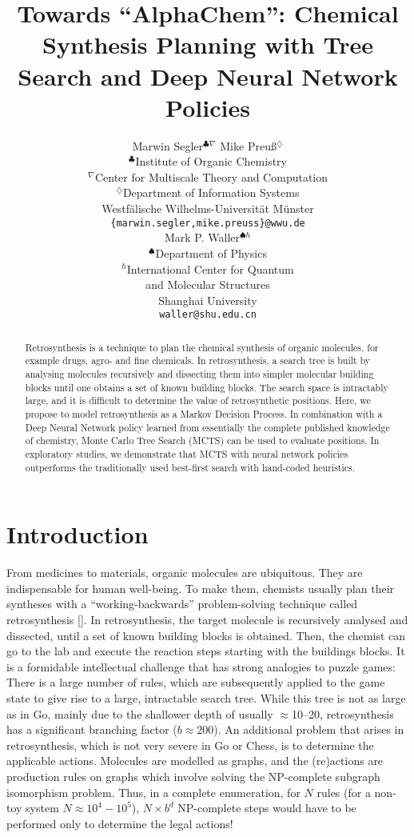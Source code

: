 \documentclass{article} %
\title{
Towards ``AlphaChem'': 
Chemical Synthesis Planning with Tree Search and Deep Neural Network Policies}
\author{Marwin Segler$^{\clubsuit\nabla}$  \qquad  Mike Preu{\ss}$^\diamondsuit$ \\
$^\clubsuit$Institute of Organic Chemistry\\
$^\nabla$Center for Multiscale Theory and Computation\\
$^\diamondsuit$Department of Information Systems\\
Westf\"alische Wilhelms-Universit\"at M\"unster\\
\texttt{\{marwin.segler,mike.preuss\}@wwu.de} \\
\And
Mark P. Waller$^{\spadesuit\hbar}$\\
$^\spadesuit$Department of Physics\\
$^\hbar$International Center for Quantum\\ and Molecular Structures\\
Shanghai University\\
\texttt{waller@shu.edu.cn} \\
}
\begin{document}
\maketitle

\begin{abstract}
Retrosynthesis is a technique to plan the chemical synthesis of organic molecules, for example drugs, agro- and fine chemicals. In retrosynthesis, a search tree is built by analysing  molecules recursively and dissecting them into simpler molecular building blocks until one obtains a set of known building blocks. The search space is intractably large,  and it is difficult to determine the value of retrosynthetic positions. Here, we propose to model retrosynthesis as a Markov Decision Process. In combination with a Deep Neural Network policy learned from essentially the complete published knowledge of chemistry, Monte Carlo Tree Search (MCTS) can be used to evaluate positions. In exploratory studies, we demonstrate that MCTS with neural network policies outperforms the traditionally used best-first search with hand-coded heuristics.
\end{abstract}




\section{Introduction}
From medicines to materials, organic molecules are ubiquitous. They are indispensable for human well-being. To make them, chemists usually plan their syntheses with a ``working-backwards'' problem-solving technique called retrosynthesis [\cite{corey1989logic}]. In retrosynthesis, the target molecule is recursively analysed and dissected, until a set of known building blocks is obtained. Then, the chemist can go to the lab and execute the reaction steps starting with the buildings blocks. It is a formidable intellectual challenge that has strong analogies to puzzle games: There is a large number of rules, which are subsequently applied to the game state to give rise to a large, intractable search tree. While this tree is not as large as in Go, mainly due to the shallower depth of usually $\approx$10--20, retrosynthesis has a significant branching factor ($b\approx200$). An additional problem that arises in retrosynthesis, which is not very severe in Go or Chess, is to determine the applicable actions. Molecules are modelled as graphs, and the (re)actions are production rules on graphs which involve solving the NP-complete subgraph isomorphism problem. Thus, in a complete enumeration, for $N$ rules (for a non-toy system $N\approx10^4 - 10^5$), $N\times b^d$ NP-complete steps would have to be performed only to determine the legal actions!
\end{document}
